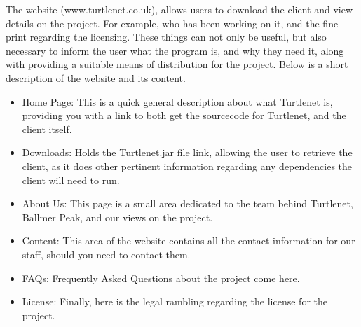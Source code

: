 The website (www.turtlenet.co.uk), allows users to download the client and view 
details on the project. For example, who has been working on it, and the fine 
print regarding the licensing. These things can not only be useful, but also 
necessary to inform the user what the program is, and why they need it, along 
with providing a suitable means of distribution for the project. Below is a 
short description of the website and its content.


\begin{itemize}
\item Home Page: This is a quick general description about what Turtlenet is, 
providing you with a link to both get the sourcecode for Turtlenet, and the 
client itself.
\item Downloads: Holds the Turtlenet.jar file link, allowing the user to retrieve
the client, as it does other pertinent information regarding any dependencies the
client will need to run.
\item About Us: This page is a small area dedicated to the team behind Turtlenet, 
Ballmer Peak, and our views on the project.
\item Content: This area of the website contains all the contact information for 
our staff, should you need to contact them.
\item FAQs: Frequently Asked Questions about the project come here.
\item License: Finally, here is the legal rambling regarding the license for the 
project.
\end{itemize}